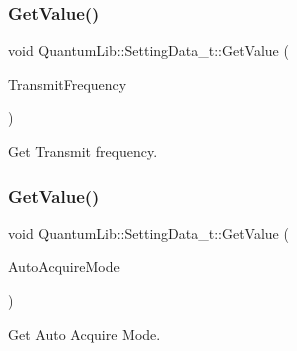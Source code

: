 \subsubsection{\texorpdfstring{Get\+Value()}{GetValue()}\hspace{0.1cm}{\footnotesize\ttfamily [9/26]}}
{\footnotesize\ttfamily void Quantum\+Lib\+::\+Setting\+Data\+\_\+t\+::\+Get\+Value (\begin{DoxyParamCaption}\item[{\mbox{\hyperlink{namespace_quantum_lib_af636ea7f14f5a62bfcfc1132c9c78019}{e\+Transmit\+Frequency\+\_\+t}} \&}]{Transmit\+Frequency }\end{DoxyParamCaption})\hspace{0.3cm}{\ttfamily [inline]}}



Get Transmit frequency. 

\mbox{\label{struct_quantum_lib_1_1_setting_data__t_a6772159d5411ecb08352a3021a983298}} 
\subsubsection{\texorpdfstring{Get\+Value()}{GetValue()}\hspace{0.1cm}{\footnotesize\ttfamily [10/26]}}
{\footnotesize\ttfamily void Quantum\+Lib\+::\+Setting\+Data\+\_\+t\+::\+Get\+Value (\begin{DoxyParamCaption}\item[{\mbox{\hyperlink{namespace_quantum_lib_ad91dac4bf2ef5d3615cb423383b961d8}{e\+Auto\+Acquire\+Mode\+\_\+t}} \&}]{Auto\+Acquire\+Mode }\end{DoxyParamCaption})\hspace{0.3cm}{\ttfamily [inline]}}



Get Auto Acquire Mode. 

\mbox{\label{struct_quantum_lib_1_1_setting_data__t_ada56714337dd308a32c70fe184bbe74e}} 

